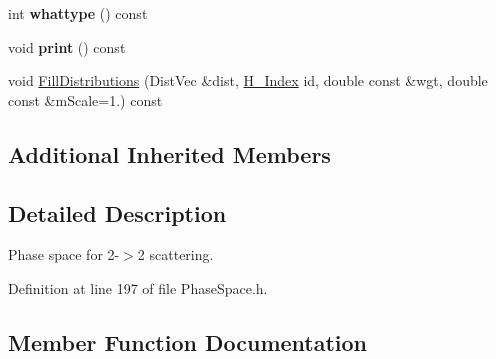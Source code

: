 \begin{DoxyCompactItemize}
\item 
\hypertarget{classPS__2__2_a27ba82e9c32ba391be7df643181de646}{}int {\bfseries whattype} () const \label{classPS__2__2_a27ba82e9c32ba391be7df643181de646}

\item 
\hypertarget{classPS__2__2_af19d44fe30fb72ccfc20f5626f04dcdc}{}void {\bfseries print} () const \label{classPS__2__2_af19d44fe30fb72ccfc20f5626f04dcdc}

\item 
void \hyperlink{classPS__2__2_a253769d43f0d405d6109d16805a4b0c2}{Fill\+Distributions} (Dist\+Vec \&dist, \hyperlink{HistArray_8h_abdf25c9f0ab78c4243f63cb2bacf26d9}{H\+\_\+\+Index} id, double const \&wgt, double const \&m\+Scale=1.) const 
\end{DoxyCompactItemize}
\subsection*{Additional Inherited Members}


\subsection{Detailed Description}
Phase space for 2-\/$>$2 scattering. 

Definition at line 197 of file Phase\+Space.\+h.



\subsection{Member Function Documentation}
\hypertarget{classPS__2__2_a253769d43f0d405d6109d16805a4b0c2}{}
